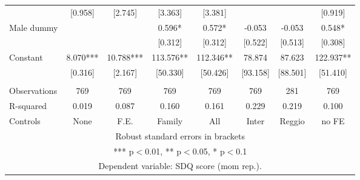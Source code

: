 \begin{tabular}{lccccccc}
 & [0.958] & [2.745] & [3.363] & [3.381] &  &  & [0.919] \\
Male dummy &  &  & 0.596* & 0.572* & -0.053 & -0.053 & 0.548* \\
 &  &  & [0.312] & [0.312] & [0.522] & [0.513] & [0.308] \\
Constant & 8.070*** & 10.788*** & 113.576** & 112.346** & 78.874 & 87.623 & 122.937** \\
 & [0.316] & [2.167] & [50.330] & [50.426] & [93.158] & [88.501] & [51.410] \\
 &  &  &  &  &  &  &  \\
Observations & 769 & 769 & 769 & 769 & 769 & 281 & 769 \\
R-squared & 0.019 & 0.087 & 0.160 & 0.161 & 0.229 & 0.219 & 0.100 \\
 Controls & None & F.E. & Family & All & Inter & Reggio & no FE \\ \hline
\multicolumn{8}{c}{ Robust standard errors in brackets} \\
\multicolumn{8}{c}{ *** p$<$0.01, ** p$<$0.05, * p$<$0.1} \\
\multicolumn{8}{c}{ Dependent variable: SDQ score (mom rep.).} \\
\end{tabular}
